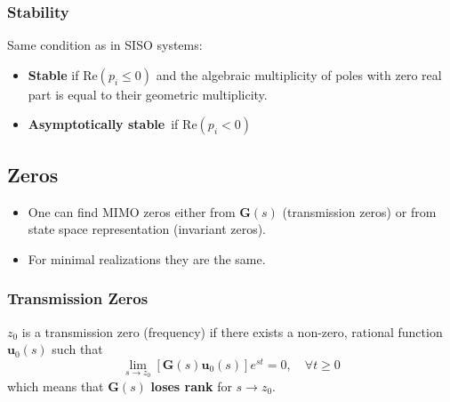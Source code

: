 \subsubsection{Stability}

Same condition as in SISO systems:
\begin{itemize}
    \item \textbf{Stable} if $\mathrm{Re}(p_i \le 0)$ and the algebraic multiplicity of poles with zero real part is equal to their geometric multiplicity.
    \item \textbf{Asymptotically stable}\ if $\mathrm{Re}(p_i<0)$
\end{itemize}


\subsection{Zeros}
\begin{itemize}
    \item One can find MIMO zeros either from $\mathbf{G}(s)$ (transmission zeros) or from state space representation (invariant zeros).
    \item For minimal realizations they are the same.
\end{itemize}

\subsubsection{Transmission Zeros}

$z_0$ is a transmission zero (frequency) if there exists a non-zero, rational function $\mathbf{u}_0(s)$ such that
\begin{equation*}
    \lim_{s\to z_0}\left[\mathbf{G}(s)\mathbf{u}_0(s)\right]e^{st}=0,\quad\forall t\geq0
\end{equation*}
which means that $\mathbf{\mathbf{G}}(s)$ \textbf{loses rank} for $s\to z_0$.


